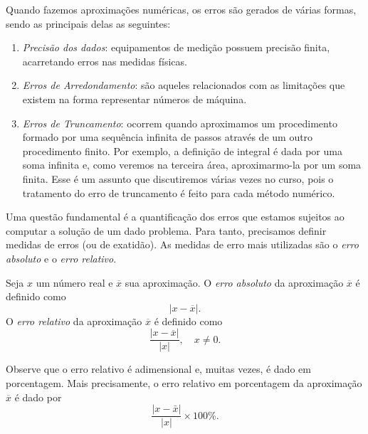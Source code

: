 \documentclass[main.tex]{subfiles}
\begin{document}
Quando fazemos aproximações numéricas, os erros são gerados de várias formas, sendo as principais delas as seguintes:
\begin{enumerate}
 \item \emph{Precisão dos dados}: equipamentos de medição possuem precisão finita, acarretando erros nas medidas físicas.
 \item \emph{Erros de Arredondamento}: são aqueles relacionados com as limitações que existem na forma representar números de máquina. 
 \item \emph{Erros de Truncamento}: ocorrem quando aproximamos um procedimento formado por uma sequência infinita de passos através de um outro procedimento finito. Por exemplo, a definição de integral é dada por uma soma infinita e, como veremos na terceira área, aproximarmo-la por um soma finita. Esse é um assunto que discutiremos várias vezes no curso, pois o tratamento do erro de truncamento é feito para cada método numérico.
\end{enumerate}

Uma questão fundamental é a quantificação dos erros que estamos sujeitos ao computar a solução de um dado problema. Para tanto, precisamos definir medidas de erros (ou de exatidão). As medidas de erro mais utilizadas são o \emph{erro absoluto} e o \emph{erro relativo}.

\begin{defn} Seja $x$ um número real e $\overline{x}$ sua aproximação. O \emph{erro absoluto} da aproximação $\overline{x}$ é definido como
  \begin{equation*}
    |x-\overline{x}|.
  \end{equation*}
O \emph{erro relativo} da aproximação $\overline{x}$ é definido como
\begin{equation*}
\frac{|x-\overline{x}|}{|x|},\quad x\neq 0.
\end{equation*}
\end{defn}

\begin{obs}
  Observe que o erro relativo é adimensional e, muitas vezes, é dado em porcentagem. Mais precisamente, o erro relativo em porcentagem da aproximação $\overline{x}$ é dado por
  \begin{equation*}
    \frac{|x-\bar{x}|}{|x|}\times 100 \%.
  \end{equation*}
\end{obs}
\end{document}
